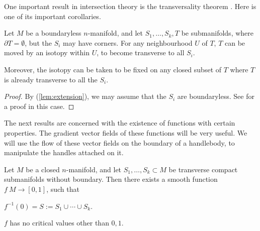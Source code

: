 One important result in intersection theory is the transversality theorem \cite[p.\,68]{gp}.
Here is one of its important corollaries.

\begin{lemma}\label{cor:transverse}
Let $M$ be a boundaryless $n$-manifold,
and let $S_1,\dotsc,S_k,T$ be submanifolds,
where $\partial T=\emptyset$, but the $S_i$ may have corners.
For any neighbourhood $U$ of $T$,
$T$ can be moved by an isotopy within $U$,
to become transverse to all $S_i$.

Moreover, the isotopy can be taken to be fixed on any closed subset of $T$
where $T$ is already transverse to all the $S_i$.
\end{lemma}

\begin{proof}
By (\ref{lem:extension}), we may assume that the $S_i$ are boundaryless.
See \cite[p.\,70]{gp} for a proof in this case.
\end{proof}

The next results are concerned with the existence of
functions with certain properties.
The gradient vector fields of these functions will be very useful.
We will use the flow of these vector fields on the boundary of a handlebody,
to manipulate the handles attached on it.

\begin{lemma}\label{lem:function}
Let $M$ be a closed $n$-manifold,
and let $S_1,\dotsc,S_k\subset M$ be transverse compact submanifolds without boundary.
Then there exists a smooth function $f\:M\to[0,1]$, such that
\begin{enum}
\item $f^{-1}(0)=S:=S_1\cup\cdots\cup S_k$.
\item $f$ has no critical values other than $0,1$.
\end{enum}
\end{lemma}

